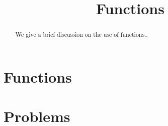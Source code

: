 \documentclass{ximera}
\title{Functions}
\begin{document}
  
\begin{abstract}  
We give a brief discussion on the use of functions..
\end{abstract}  
\maketitle

\section{Functions}



\section{Problems}

\begin{question}
\end{question}

\begin{question}
\end{question}
\end{document}

